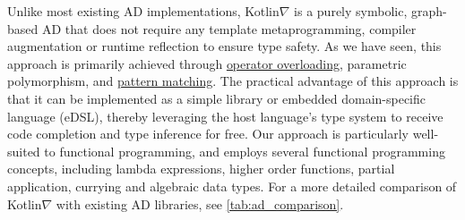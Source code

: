 \documentclass[12pt,initial,twoside,maitrise]{dms}
\numberwithin{equation}{section}
\numberwithin{table}{chapter}
\numberwithin{figure}{chapter}
\begin{document}
Unlike most existing AD implementations, Kotlin$\nabla$ is a purely symbolic, graph-based AD that does not require any template metaprogramming, compiler augmentation or runtime reflection to ensure type safety. As we have seen, this approach is primarily achieved through \hyperref[sec:operator-overloading]{operator overloading}, parametric polymorphism, and \hyperref[sec:adts]{pattern matching}. The practical advantage of this approach is that it can be implemented as a simple library or embedded domain-specific language (eDSL), thereby leveraging the host language's type system to receive code completion and type inference for free. Our approach is particularly well-suited to functional programming, and employs several functional programming concepts, including lambda expressions, higher order functions, partial application, currying and algebraic data types. For a more detailed comparison of Kotlin$\nabla$ with existing AD libraries, see \autoref{tab:ad_comparison}.\\
\end{document}
